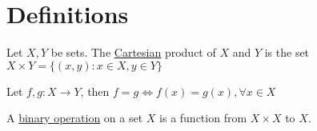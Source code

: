 \chapter{Definitions}

\begin{mydef}
\normalfont Let \(X,Y\) be sets. The \underline{Cartesian} product of \(X\) and \(Y\) is the set \(X \times Y = \{(x, y) : x \in X, y \in Y\}\)
\end{mydef}

\begin{mydef}
\normalfont Let \(f, g : X \to Y\), then \(f = g \Leftrightarrow f(x) = g(x), \forall x \in X\)
\end{mydef}

\begin{mydef}
\normalfont A \underline{binary operation} on a set \(X\) is a function from \(X \times X\) to \(X\).
\end{mydef}

